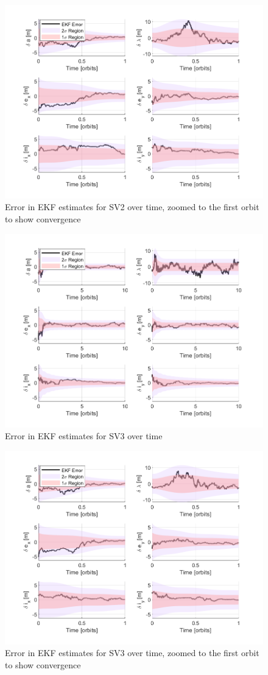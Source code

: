 \begin{figure}[H]
    \centering
    \includegraphics[width=0.7\linewidth]{sim/figures/PS8/EKF_error_SV2_zoomed.png}
    \caption{Error in EKF estimates for SV2 over time, zoomed to the first orbit to show convergence}
    \label{fig:sv2_ekf_error_zoomed}
\end{figure}

\begin{figure}[H]
    \centering
    \includegraphics[width=0.7\linewidth]{sim/figures/PS8/EKF_error_SV3.png}
    \caption{Error in EKF estimates for SV3 over time}
    \label{fig:sv3_ekf_error}
\end{figure}

\begin{figure}[H]
    \centering
    \includegraphics[width=0.7\linewidth]{sim/figures/PS8/EKF_error_SV3_zoomed.png}
    \caption{Error in EKF estimates for SV3 over time, zoomed to the first orbit to show convergence}
    \label{fig:sv3_ekf_error_zoomed}
\end{figure}


